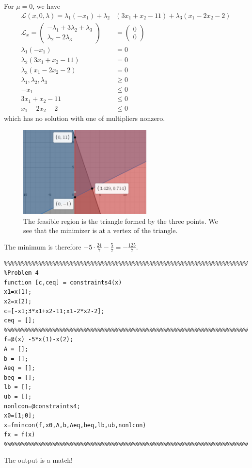 \documentclass[12pt]{article}
\begin{document}
\begin{problem}[4]
For $ \mu=0$, we have
\begin{align*}
	\mathscr{L}(x,0,\lambda) = \lambda_1(-x_1) + \lambda_2 & (3x_1+x_2-11)+ \lambda_3(x_1-2x_2-2) \\
	\mathscr{L}_x = \begin{pmatrix}  -\lambda_1+3\lambda_2+\lambda_3\\ \lambda_2-2\lambda_3 \end{pmatrix}  &= \begin{pmatrix} 0\\0 \end{pmatrix}  \\
	\lambda_1(-x_1) &= 0 \\
	\lambda_2(3x_1+x_2-11) &= 0 \\
	\lambda_3(x_1-2x_2-2) &= 0 \\
	\lambda_1,\lambda_2,\lambda_3 &\geq 0\\
	-x_1 &\leq 0\\
	3x_1+x_2-11 &\leq 0\\
	x_1-2x_2-2 & \leq 0
\end{align*}
which has no solution with one of multipliers nonzero.
~\begin{figure}[H]
	\centering
	\includegraphics[width=0.6\textwidth]{./figures/feasible_region}
	\caption{The feasible region is the triangle formed by the three points. We see that the minimizer is at a vertex of the triangle.}
	\label{fig:feasible_region}
\end{figure}
The minimum is therefore $ -5 \cdot \frac{24}{7}-\frac{5}{7} = -\frac{125}{ 7}$.

\begin{lstlisting}
%%%%%%%%%%%%%%%%%%%%%%%%%%%%%%%%%%%%%%%%%%%%%%%%%%%%%%%%%%%%%%%%%%%%%%%%%%
%Problem 4
function [c,ceq] = constraints4(x)
x1=x(1);
x2=x(2);
c=[-x1;3*x1+x2-11;x1-2*x2-2];
ceq = [];
%%%%%%%%%%%%%%%%%%%%%%%%%%%%%%%%%%%%%%%%%%%%%%%%%%%%%%%%%%%%%%%%%%%%%%%%%%
f=@(x) -5*x(1)-x(2);
A = [];
b = [];
Aeq = [];
beq = [];
lb = [];
ub = [];
nonlcon=@constraints4;
x0=[1;0];
x=fmincon(f,x0,A,b,Aeq,beq,lb,ub,nonlcon)
fx = f(x)
%%%%%%%%%%%%%%%%%%%%%%%%%%%%%%%%%%%%%%%%%%%%%%%%%%%%%%%%%%%%%%%%%%%%%%%%%%
\end{lstlisting}
The output is a match!
\end{problem}
\end{document}
